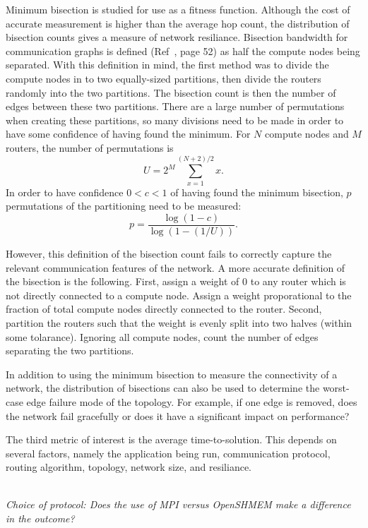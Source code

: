 \documentclass[pdftex]{article}
\begin{document}
Minimum bisection is studied for use as a fitness function. Although the cost of accurate measurement is higher than the average hop count, the distribution of bisection counts gives a measure of network resiliance. Bisection bandwidth for communication graphs is defined (Ref~\cite{1980_Thompson}, page 52) as half the compute nodes being separated. With this definition in mind, the first method was to divide the compute nodes in to two equally-sized partitions, then divide the routers randomly into the two partitions. The bisection count is then the number of edges between these two partitions. There are a large number of permutations when creating these partitions, so many divisions need to be made in order to have some confidence of having found the minimum. For $N$ compute nodes and $M$ routers, the number of permutations is
\begin{equation}
 U = 2^M \sum_{x=1}^{(N+2)/2}x.
\end{equation}
In order to have confidence $0<c<1$ of having found the minimum bisection, $p$ permutations of the partitioning need to be measured:
\begin{equation}
 p = \frac{\log(1-c)}{\log(1-(1/U))}.
\end{equation}

However, this definition of the bisection count fails to correctly capture the relevant communication features of the network. A more accurate definition of the bisection is the following. First, assign a weight of 0 to any router which is not directly connected to a compute node. Assign a weight proporational to the fraction of total compute nodes directly connected to the router. Second, partition the routers such that the weight is evenly split into two halves (within some tolarance). Ignoring all compute nodes, count the number of edges separating the two partitions.

In addition to using the minimum bisection to measure the connectivity of a network, the distribution of bisections can also be used to determine the worst-case edge failure mode of the topology. For example, if one edge is removed, does the network fail gracefully or does it have a significant impact on performance?

The third metric of interest is the average time-to-solution. This depends on several factors, namely the application being run, communication protocol, routing algorithm, topology, network size, and resiliance. 

\ \\
\textit{Choice of protocol: Does the use of MPI versus OpenSHMEM make a difference in the outcome?}
\end{document}
